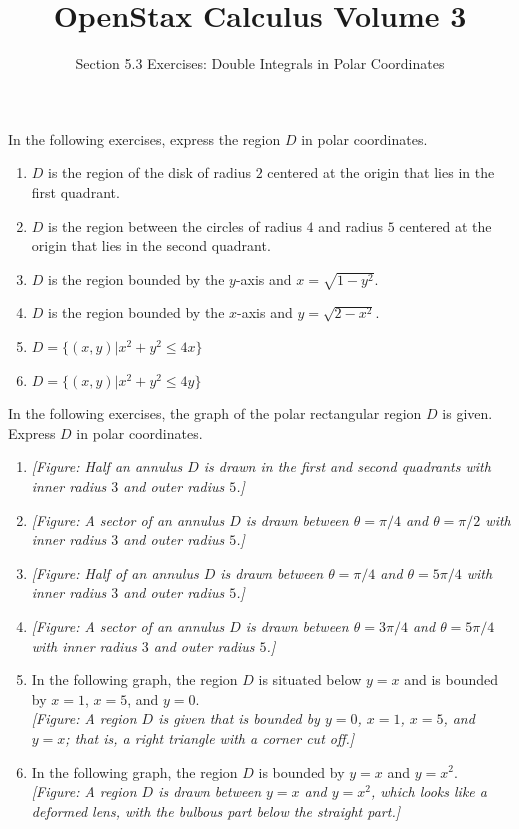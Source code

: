 \documentclass{exercises}
\title{OpenStax Calculus Volume 3}
\subtitle{Section 5.3 Exercises: Double Integrals in Polar Coordinates}
\author{}
\date{}
\begin{document}
\maketitle


In the following exercises, express the region $D$ in polar coordinates.

\begin{enumerate}[start=1]
\item $D$ is the region of the disk of radius $2$ centered at the origin that lies in the first quadrant.
\item $D$ is the region between the circles of radius $4$ and radius $5$ centered at the origin that lies in the second quadrant.
\item $D$ is the region bounded by the $y$-axis and $x=\sqrt{1-y^{2}}$.
\item $D$ is the region bounded by the $x$-axis and $y=\sqrt{2-x^{2}}$.
\item $D=\{(x,y)|x^{2}+y^{2}\le4x\}$
\item $D=\{(x,y)|x^{2}+y^{2}\le4y\}$
\end{enumerate}

In the following exercises, the graph of the polar rectangular region $D$ is given. Express $D$ in polar coordinates.

\begin{enumerate}[resume]
\item \textit{[Figure: Half an annulus $D$ is drawn in the first and second quadrants with inner radius $3$ and outer radius $5$.]}
\item \textit{[Figure: A sector of an annulus $D$ is drawn between $\theta=\pi/4$ and $\theta=\pi/2$ with inner radius $3$ and outer radius $5$.]}
\item \textit{[Figure: Half of an annulus $D$ is drawn between $\theta=\pi/4$ and $\theta=5\pi/4$ with inner radius $3$ and outer radius $5$.]}
\item \textit{[Figure: A sector of an annulus $D$ is drawn between $\theta=3\pi/4$ and $\theta=5\pi/4$ with inner radius $3$ and outer radius $5$.]}
\item In the following graph, the region $D$ is situated below $y=x$ and is bounded by $x=1$, $x=5$, and $y=0$. \\ \textit{[Figure: A region $D$ is given that is bounded by $y=0$, $x=1$, $x=5$, and $y=x$; that is, a right triangle with a corner cut off.]}
\item In the following graph, the region $D$ is bounded by $y=x$ and $y=x^{2}$. \\ \textit{[Figure: A region $D$ is drawn between $y=x$ and $y=x^{2}$, which looks like a deformed lens, with the bulbous part below the straight part.]}
\end{enumerate}
\end{document}
